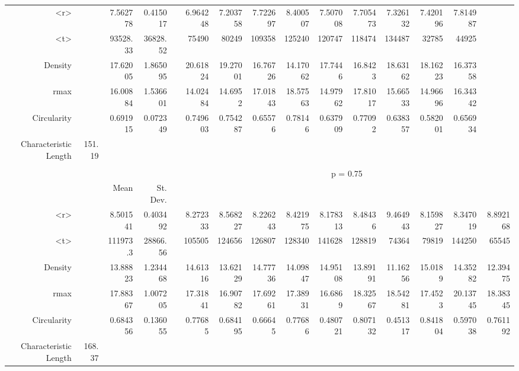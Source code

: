 \begin{table}[htbp]
\begin{tabular}{rrrrrrrrrrrrrrr}
    <r>   &       & 7.562778 & 0.415017 &       & 6.964248 & 7.203758 & 7.722697 & 8.400507 & 7.507008 & 7.705473 & 7.326132 & 7.420196 & 7.814987 &  \\
    <t>   &       & 93528.33 & 36828.52 &       & 75490 & 80249 & 109358 & 125240 & 120747 & 118474 & 134487 & 32785 & 44925 &  \\
    Density &       & 17.62005 & 1.865095 &       & 20.61824 & 19.27001 & 16.76726 & 14.17062 & 17.7446 & 16.8423 & 18.63162 & 18.16223 & 16.37358 &  \\
    rmax  &       & 16.00884 & 1.536601 &       & 14.02484 & 14.6952 & 17.01843 & 18.57563 & 14.97962 & 17.81017 & 15.66533 & 14.96696 & 16.34342 &  \\
    Circularity &       & 0.691915 & 0.072349 &       & 0.749603 & 0.754287 & 0.65576 & 0.78146 & 0.637909 & 0.77092 & 0.638357 & 0.582001 & 0.656934 &  \\
    Characteristic Length & 151.19 &       &       &       &       &       &       &       &       &       &       &       &       &  \\
          &       &       &       &       &       &       &       &       &       &       &       &       &       &  \\
          &       &       &       &       & \multicolumn{10}{c}{p = 0.75} \\
          &       & Mean  & St. Dev. &       &       &       &       &       &       &       &       &       &       &  \\
    <r>   &       & 8.501541 & 0.403492 &       & 8.272333 & 8.568227 & 8.226243 & 8.421975 & 8.178313 & 8.48436 & 9.464943 & 8.159827 & 8.347019 & 8.892168 \\
    <t>   &       & 111973.3 & 28866.56 &       & 105505 & 124656 & 126807 & 128340 & 141628 & 128819 & 74364 & 79819 & 144250 & 65545 \\
    Density &       & 13.88823 & 1.234468 &       & 14.61316 & 13.62129 & 14.77736 & 14.09847 & 14.95108 & 13.89191 & 11.16256 & 15.0189 & 14.35282 & 12.39475 \\
    rmax  &       & 17.88367 & 1.007205 &       & 17.31841 & 16.90782 & 17.69261 & 17.38931 & 16.6869 & 18.32567 & 18.54281 & 17.4523 & 20.13745 & 18.38345 \\
    Circularity &       & 0.684356 & 0.136055 &       & 0.77685 & 0.684195 & 0.66645 & 0.77686 & 0.480721 & 0.807132 & 0.451317 & 0.841804 & 0.597038 & 0.761192 \\
    Characteristic Length & 168.37 &       &       &       &       &       &       &       &       &       &       &       &       &  \\

\end{tabular}
\end{table}
